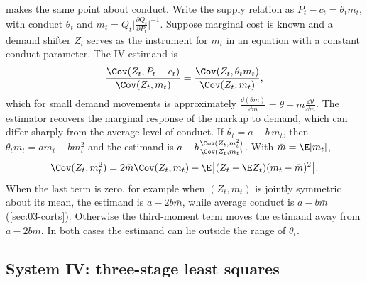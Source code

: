 \citet{Corts1999} makes the same point about conduct. Write the supply relation as $P_t - c_t = \theta_tm_t$, with
conduct $\theta_t$ and $m_t = Q_t\bigl\lvert\frac{\partial Q_t}{\partial P_t}\bigr\rvert^{-1}$. Suppose marginal cost is known and a
demand shifter $Z_t$ serves as the instrument for $m_t$ in an equation with a constant conduct parameter. The
IV estimand is
\begin{equation*}
\frac{\Cov(Z_t, P_t - c_t)}{\Cov(Z_t, m_t)} = \frac{\Cov(Z_t, \theta_tm_t)}{\Cov(Z_t, m_t)} ,
\end{equation*}
which for small demand movements is approximately $\frac{\dd(\theta m)}{\dd m} = \theta + m\frac{\dd\theta}{\dd m}$.
The estimator recovers the marginal response of the markup to demand, which can differ sharply from the average
level of conduct. If $\theta_t = a - b\,m_t$, then $\theta_tm_t = am_t - bm_t^2$ and the estimand is
$a - b\frac{\Cov(Z_t, m_t^2)}{\Cov(Z_t, m_t)}$. With $\bar m = \E[m_t]$,
\begin{equation*}
\Cov(Z_t, m_t^2) = 2\bar m\Cov(Z_t, m_t) + \E\bigl[(Z_t - \E Z_t)(m_t - \bar m)^2\bigr] .
\end{equation*}
When the last term is zero, for example when $(Z_t, m_t)$ is jointly symmetric about its mean, the estimand is
$a - 2b\bar m$, while average conduct is $a - b\bar m$ (\cref{sec:03-corts}). Otherwise the third-moment term moves the
estimand away from $a - 2b\bar m$. In both cases the estimand can lie outside the range of $\theta_t$.

\subsection{System IV: three-stage least squares}\label{sec:A-3sls}


